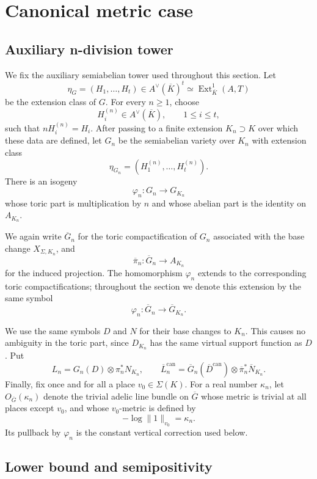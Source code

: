 \documentclass[10pt,a4paper]{amsart}
\theoremstyle{plain}
\theoremstyle{plain}
\numberwithin{equation}{section}
\providecommand{\can}{\operatorname{can}}
\begin{document}
\section{Canonical metric case}

\subsection{Auxiliary n-division tower}

We fix the auxiliary semiabelian tower used throughout this section.  Let
\[
\eta_G=(H_1,\ldots,H_t)\in A^\vee(\overline K)^t
\simeq \operatorname{Ext}^1_{\overline K}(A,T)
\]
be the extension class of \(G\).  For every \(n\ge1\), choose
\[
H_i^{(n)}\in A^\vee(\overline K),\qquad 1\le i\le t,
\]
such that \(nH_i^{(n)}=H_i\).  After passing to a finite extension
\(K_n\supset K\) over which these data are defined, let \(G_n\) be the semiabelian
variety over \(K_n\) with extension class
\[
\eta_{G_n}=(H_1^{(n)},\ldots,H_t^{(n)}).
\]
There is an isogeny
\[
\varphi_n:G_n\longrightarrow G_{K_n}
\]
whose toric part is multiplication by \(n\) and whose abelian part is the
identity on \(A_{K_n}\).

We again write \(\overline G_n\) for the toric compactification of \(G_n\)
associated with the base change \(X_{\Sigma,K_n}\), and
\[
\overline\pi_n:\overline G_n\longrightarrow A_{K_n}
\]
for the induced projection.  The homomorphism \(\varphi_n\) extends to the
corresponding toric compactifications; throughout the section we denote this
extension by the same symbol
\[
\varphi_n:\overline G_n\longrightarrow \overline G_{K_n}.
\]

We use the same symbols \(D\) and \(N\) for their base changes to \(K_n\).  This
causes no ambiguity in the toric part, since \(D_{K_n}\) has the same virtual
support function as \(D\).  Put
\[
L_n=G_n(D)\otimes\pi_n^*N_{K_n},
\qquad
\overline L_n^{\can}
=
\overline G_n(\overline D^{\can})\otimes
\overline\pi_n^*\overline N_{K_n}.
\]
Finally, fix once and for all a place \(v_0\in\Sigma(K)\).  For a real number
\(\kappa_n\), let \(O_{\overline G}(\kappa_n)\) denote the trivial adelic line
bundle on \(\overline G\) whose metric is trivial at all places except
\(v_0\), and whose \(v_0\)-metric is defined by
\[
-\log\|1\|_{v_0}=\kappa_n .
\]
Its pullback by \(\varphi_n\) is the constant vertical correction used below.

\subsection{Lower bound and semipositivity}
\end{document}
